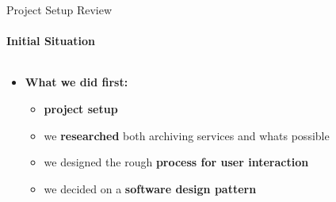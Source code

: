 \documentclass[
    ngerman,%
    authorontitle=true,
]{bfhbeamer}
\begin{document}
    \begin{frame}{Project Setup Review}
        \framesubtitle{Initial Situation}
    	\begin{columns} %
    		\begin{column}{0.7\textwidth} %
    			\begin{itemize}
    				\item \textbf{What we did first:}
    				\begin{itemize}
                        \item \textbf{project setup}
    				    \item we \textbf{researched} both archiving services and whats possible
    				    \item we designed the rough \textbf{process for user interaction}
    				    \item we decided on a \textbf{software design pattern}
                    \end{itemize}
    				\bigskip
                    \bigskip
                    \bigskip
    			\end{itemize}
    		\end{column}
    		\begin{column}{0.23\textwidth} %
	    		\begin{center}

\end{center}
\end{column}
\end{columns}
\end{frame}
\end{document}
